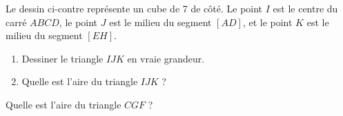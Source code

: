 
\begin{exercice}\label{exoSeconde-0095}

    \begin{multicols}{2}

        Le dessin ci-contre représente un cube de \unit{7}{\centi\meter} de côté. Le point \( I\) est le centre du carré \( ABCD\), le point \( J\) est le milieu du segment \( [AD]\), et le point \( K\) est le milieu du segment \( [EH]\).

        \begin{enumerate}
    \item
        Dessiner le triangle \( IJK\) en vraie grandeur.
            \item
        Quelle est l'aire du triangle \( IJK\) ?
        \end{enumerate}

        \columnbreak

        \begin{center}

        \end{center}

    \end{multicols}
    
    Quelle est l'aire du triangle \( CGF\) ?

\end{exercice}
